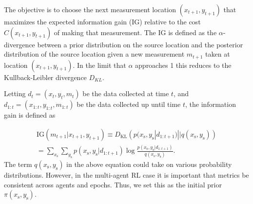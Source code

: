 \documentclass[letterpaper]{article} %
\begin{document}
The objective is to choose the next measurement location $(x_{t+1}, y_{t+1})$ that maximizes the expected information gain (IG) relative to the cost $C(x_{t+1}, y_{t+1})$ of making that measurement. The IG is defined as the $\alpha$-divergence \cite{renyi1961alpadiv} between a prior distribution on the source location and the posterior distribution of the source location given a new measurement $m_{t+1}$ taken at location $(x_{t+1}, y_{t+1})$. In the limit that $\alpha$ approaches 1 this reduces to the Kullback-Leibler divergence $D_{KL}$. 

Letting $d_t = (x_t, y_t, m_t)$ be the data collected at time $t$, and $d_{1:t} = (x_{1:t}, y_{1:t}, m_{1:t})$ be the data collected up until time $t$, the information gain is defined as

\begin{multline*}
  \mathrm{IG}(m_{t+1}| x_{t+1}, y_{t+1}) \equiv D_{\mathrm{KL}}\left(p(x_{\text{s}}, y_{\text{s}}| d_{1:t+1}) || q(x_{\text{s}},y_{\text{s}})\right)\\
  =  \sum_{x_{\text{s}}} \sum_{y_{\text{s}}} p(x_{\text{s}}, y_{\text{s}}| d_{1:t+1})  \log \frac{p(x_{\text{s}}, y_{\text{s}}| d_{1:t+1})}{q(x_{\text{s}},y_{\text{s}})}.
    \label{equ:ig}
\end{multline*}
The term $q(x_{\text{s}}, y_{\text{s}})$ in the above equation could take on various probability distributions. However, in the multi-agent RL case it is important that metrics be consistent across agents and epochs. 
Thus, we set this as the initial prior $\pi(x_{\text{s}}, y_{\text{s}})$.
\end{document}
